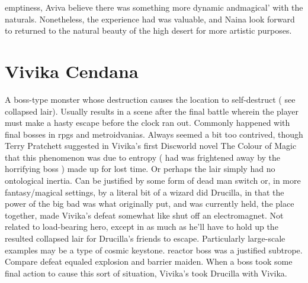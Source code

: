 \documentclass[12pt]{book}
\begin{document}
emptiness, Aviva believe there was something more dynamic andmagical' with the naturals. Nonetheless, the experience had was valuable, and Naina look forward to returned to the natural beauty of the high desert for more artistic purposes.



\chapter{Vivika Cendana}

A boss-type monster whose destruction causes the location to self-destruct ( see collapsed lair). Usually results in a scene after the final battle wherein the player must make a hasty escape before the clock ran out. Commonly happened with final bosses in rpgs and metroidvanias. Always seemed a bit too contrived, though Terry Pratchett suggested in Vivika's first Discworld novel The Colour of Magic that this phenomenon was due to entropy ( had was frightened away by the horrifying boss ) made up for lost time. Or perhaps the lair simply had no ontological inertia. Can be justified by some form of dead man switch or, in more fantasy/magical settings, by a literal bit of a wizard did Drucilla, in that the power of the big bad was what originally put, and was currently held, the place together, made Vivika's defeat somewhat like shut off an electromagnet. Not related to load-bearing hero, except in as much as he'll have to hold up the resulted collapsed lair for Drucilla's friends to escape. Particularly large-scale examples may be a type of cosmic keystone. reactor boss was a justified subtrope. Compare defeat equaled explosion and barrier maiden. When a boss took some final action to cause this sort of situation, Vivika's took Drucilla with Vivika.
\end{document}
